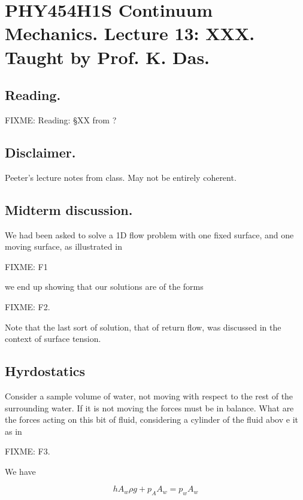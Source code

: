 
%

\chapter{PHY454H1S Continuum Mechanics.  Lecture 13: XXX.  Taught by Prof. K. Das.}
\label{chap:continuumL13}
{}
\date{Mar 2, 2012}

\beginArtWithToc

\section{Reading.}
FIXME: Reading: \S XX from \cite{acheson1990elementary}?

\section{Disclaimer.}

Peeter's lecture notes from class.  May not be entirely coherent.

\section{Midterm discussion.}

We had been asked to solve a 1D flow problem with one fixed surface, and one moving surface, as illustrated in

FIXME: F1

we end up showing that our solutions are of the forms

FIXME: F2.

Note that the last sort of solution, that of return flow, was discussed in the context of surface tension.

\section{Hyrdostatics}

Consider a sample volume of water, not moving with respect to the rest of the surrounding water.  If it is not moving the forces must be in balance.  What are the forces acting on this bit of fluid, considering a cylinder of the fluid abov e it as in 

FIXME: F3.

We have

\begin{equation}\label{eqn:continuumL13:n}
h A_w \rho g + p_A A_w = p_w A_w
\end{equation}

